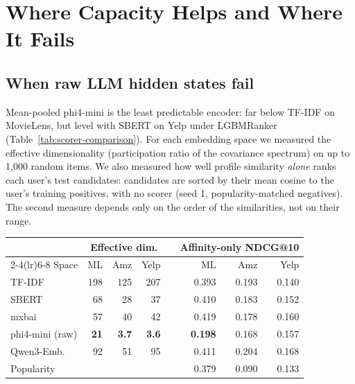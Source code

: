 \section{Where Capacity Helps and Where It Fails}
\label{sec:failure-analysis}

\subsection{When raw LLM hidden states fail}
Mean-pooled phi4-mini is the least predictable encoder: far below
TF-IDF on MovieLens, but level with SBERT on Yelp under LGBMRanker
(Table~\ref{tab:scorer-comparison}). For each embedding space we
measured the effective dimensionality (participation ratio of the
covariance spectrum) on up to 1{,}000 random items. We also measured
how well profile similarity \emph{alone} ranks each user's test
candidates: candidates are sorted by their mean cosine to the user's
training positives, with no scorer (seed 1, popularity-matched
negatives). The second measure depends only on the order of the
similarities, not on their range.

\begin{center}
\small
\setlength{\tabcolsep}{3pt}
\begin{tabular}{lrrrcrrr}
\toprule
 & \multicolumn{3}{c}{Effective dim.} & & \multicolumn{3}{c}{Affinity-only NDCG@10} \\
\cmidrule(lr){2-4}\cmidrule(lr){6-8}
Space & ML & Amz & Yelp & & ML & Amz & Yelp \\
\midrule
TF-IDF & 198 & 125 & 207 & & 0.393 & 0.193 & 0.140 \\
SBERT & 68 & 28 & 37 & & 0.410 & 0.183 & 0.152 \\
mxbai & 57 & 40 & 42 & & 0.419 & 0.178 & 0.160 \\
phi4-mini (raw) & \textbf{21} & \textbf{3.7} & \textbf{3.6} & & \textbf{0.198} & 0.168 & 0.157 \\
Qwen3-Emb. & 92 & 51 & 95 & & 0.411 & 0.204 & 0.168 \\
\midrule
Popularity & & & & & 0.379 & 0.090 & 0.133 \\
\bottomrule
\end{tabular}
\end{center}

